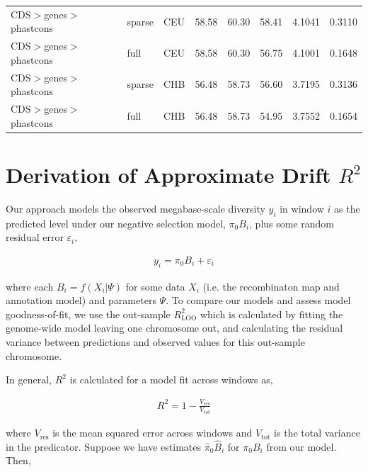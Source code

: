 \documentclass[11pt]{article}
\begin{document}
\begin{table}
\begin{tabular}{lll|crr|cc}
CDS$>$genes$>$phastcons &            sparse &          CEU &                        58.58 &             60.30 &            58.41 &                                 4.1041 &                                0.3110 \\
CDS$>$genes$>$phastcons &              full &          CEU &                        58.58 &             60.30 &            56.75 &                                 4.1001 &                                0.1648 \\
CDS$>$genes$>$phastcons &            sparse &          CHB &                        56.48 &             58.73 &            56.60 &                                 3.7195 &                                0.3136 \\
CDS$>$genes$>$phastcons &              full &          CHB &                        56.48 &             58.73 &            54.95 &                                 3.7552 &                                0.1654 \\
\hline
\end{tabular}
\end{table}


\section*{Derivation of Approximate Drift $R^2$}

Our approach models the observed megabase-scale diversity $y_i$ in window $i$
as the predicted level under our negative selection model, $\pi_0 B_i$, plus
some random residual error $\varepsilon_i$,

\begin{align}
    y_i = \pi_0 B_i + \varepsilon_i
\end{align}

where each $B_i = f(X_i | \Psi)$ for some data $X_i$ (i.e. the recombinaton map
and annotation model) and parameters $\Psi$. To compare our models and assess
model goodness-of-fit, we use the out-sample $R_\text{LOO}^2$ which is
calculated by fitting the genome-wide model leaving one chromosome out, and
calculating the residual variance between predictions and observed values for
this out-sample chromosome. 

In general, $R^2$ is calculated for a model fit across windows as,

\begin{align}
    R^2 = 1 - \frac{V_\text{res}}{V_\text{tot}}
\end{align}

where $V_\text{res}$ is the mean squared error across windows and
$V_\text{tot}$ is the total variance in the predicator. Suppose we have
estimates $\widehat{\pi}_0 \widehat{B}_i$ for $\pi_0 B_i$ from our model. Then,
\end{document}
